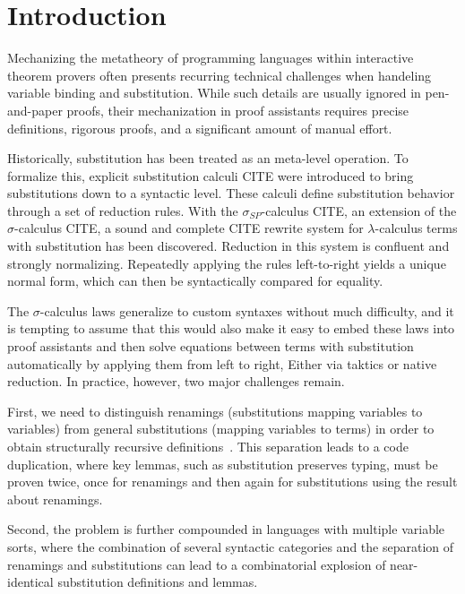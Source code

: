 \documentclass[screen,nonacm]{acmart}
\begin{document}
\maketitle

\section{Introduction}\label{sec:introduction}

Mechanizing the metatheory of programming languages within interactive theorem
provers often presents recurring technical challenges when handeling variable
binding and substitution. While such details are usually ignored in
pen-and-paper proofs, their mechanization in proof assistants requires precise
definitions, rigorous proofs, and a significant amount of manual effort.

Historically, substitution has been treated as an meta-level operation. To
formalize this, explicit substitution calculi CITE were introduced to bring
substitutions down to a syntactic level. These calculi define substitution
behavior through a set of reduction rules. With the $σ_{SP}$-calculus CITE, an
extension of the $σ$-calculus CITE, a sound and complete CITE rewrite system
for $λ$-calculus terms with substitution has been discovered. Reduction in this
system is confluent and strongly normalizing. Repeatedly applying the rules
left-to-right yields a unique normal form, which can then be syntactically
compared for equality.

The $σ$-calculus laws generalize to custom syntaxes without much difficulty,
and it is tempting to assume that this would also make it easy to embed these
laws into proof assistants and then solve equations between terms with
substitution automatically by applying them from left to right, Either via
taktics or native reduction. In practice, however, two major challenges remain.

First, we need to distinguish renamings (substitutions mapping variables to
variables) from general substitutions (mapping variables to terms) in order to
obtain structurally recursive definitions~\cite{CITE}. This separation leads to
a code duplication, where key lemmas, such as substitution preserves typing,
must be proven twice, once for renamings and then again for substitutions using
the result about renamings.

Second, the problem is further compounded in languages with multiple variable
sorts, where the combination of several syntactic categories and the separation
of renamings and substitutions can lead to a combinatorial explosion of
near-identical substitution definitions and lemmas.
\end{document}

